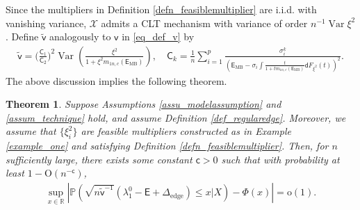 \documentclass[12pt]{article}
\theoremstyle{plain}
\newtheorem{theorem}{Theorem}[section]
\numberwithin{equation}{section}
\begin{document}
Since the multipliers in Definition \ref{defn_feasiblemultiplier} are i.i.d. with vanishing variance, $\mathcal{X}$ admits a CLT mechanism with variance of order $n^{-1}\operatorname{Var}\xi^2$.
Define $\tilde{\mathsf{v}}$ analogously to $\mathsf{v}$ in \eqref{eq_def_v} by
\begin{align*}
	\tilde{\mathsf{v}}=\Big(\frac{\mathsf{C}_1}{\mathsf{C}_2}\Big)^2\operatorname{Var} \left(\frac{\xi^2}{1+\xi^2m_{1n,c}(\mathsf{E}_{\mathrm{MB}})}\right),\quad \mathsf{C}_k=\frac{1}{n}\sum_{i=1}^p\frac{\sigma_i^k}{(\mathsf{E}_{\mathrm{MB}}-\sigma_i\int\frac{t}{1+tm_{1n,c}(\mathsf{E}_{\mathrm{MB}})}\mathsf{d}F_{\xi^2}(t))^2}.
\end{align*}
The above discussion implies the following theorem.
\begin{theorem}\label{thm_conditionalclt_nonspike}
	Suppose Assumptions \ref{assu_modelassumption} and \ref{assum_technique} hold, and assume Definition \ref{def_regularedge}. Moreover, we assume that $\{\xi_i^2\}$ are feasible multipliers constructed as in 
	Example \ref{example_one} and satisfying Definition \ref{defn_feasiblemultiplier}.
	Then, for $n$ sufficiently large, there exists some constant $\mathsf{c}>0$ such that with probability at least $1-\mathrm{O}(n^{-\mathsf{c}})$,
	\begin{align}\label{eq_conditionalclt_nonspike}
		\sup_{x\in\mathbb R}\left|\mathbb{P} \left( \sqrt{n \tilde{\mathsf{v}}^{-1}} (\lambda^0_{1}-\mathsf{E}+\Delta_{\mathrm{edge}}) \leq x \big|X \right)-\Phi(x)\right|=\mathrm{o}(1).
	\end{align}
\end{theorem}
\end{document}
